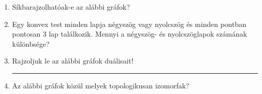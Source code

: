 \documentclass[a4paper,12pt]{article}
\begin{document}
    \noindent{}
    \noindent{}
    \begin{enumerate}
        \item Síkbarajzolhatóak-e az alábbi gráfok?
        \begin{figure}[!ht]
            \centering
            
            
            
            
            
            
        \end{figure}
        \item Egy konvex test minden lapja négyszög vagy nyolcszög és minden pontban pontosan $3$ lap találkozik. Mennyi a négyszög- és nyolcszöglapok számának különbsége?
        \item Rajzoljuk le az alábbi gráfok duálisait!
            \begin{figure}[ht]
                \centering
                \begin{subfigure}{0.2\textwidth}
                    \centering
                    
                    \caption{}
                \end{subfigure}
                \begin{subfigure}{0.2\textwidth}
                    \centering
                    
                    \caption{}
                \end{subfigure}
                \begin{subfigure}{0.2\textwidth}
                    \centering
                    
                    \caption{}
                \end{subfigure}
                \begin{subfigure}{0.2\textwidth}
                    \centering
                    
                    \caption{}
                \end{subfigure}
            \end{figure}
        \hrule
            \item Az alábbi gráfok közül melyek topologikusan izomorfak?
			\begin{figure}[!ht]
				\centering
				\begin{subfigure}{0.15\textwidth}

\end{subfigure}
\end{figure}
\end{enumerate}
\end{document}
